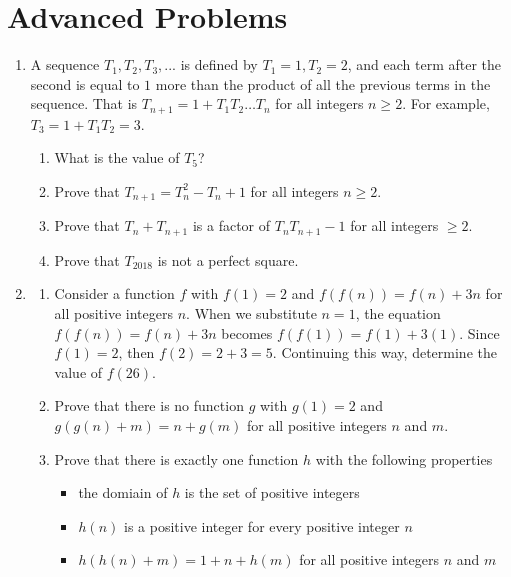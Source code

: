 \documentclass[12pt]{article}
\begin{document}
\section*{Advanced Problems}
\begin{enumerate}
    \item A sequence $T_1, T_2, T_3, ...$ is defined by $T_1 = 1, T_2 = 2$, and each term after the second is equal to $1$ more than the product of all the previous terms in the sequence. That is $T_{n + 1} = 1 + T_1T_2 \dots T_n$ for all integers $n \geq 2$. For example, $T_3 = 1 + T_1T_2 = 3$.
    \begin{enumerate}
        \item What is the value of $T_5$?
        \item Prove that $T_{n + 1} = T_n^2 - T_n + 1$ for all integers $n \geq 2$.
        \item Prove that $T_n + T_{n + 1}$ is a factor of $T_nT_{n + 1} - 1$ for all integers $\geq 2$.
        \item Prove that $T_{2018}$ is not a perfect square.
    \end{enumerate} \newpage

    \item 
    \begin{enumerate}
        \item Consider a function $f$ with $f(1) = 2$ and $f(f(n)) = f(n) + 3n$ for all positive integers $n$. When we substitute $n = 1$, the equation $f(f(n)) = f(n) + 3n$ becomes $f(f(1)) = f(1) + 3(1)$. Since $f(1) = 2$, then $f(2) = 2 + 3 = 5$. Continuing this way, determine the value of $f(26)$.
        \item Prove that there is no function $g$ with $g(1) = 2$ and $g(g(n) + m) = n + g(m)$ for all positive integers $n$ and $m$.
        \item Prove that there is exactly one function $h$ with the following properties
        \begin{itemize}
            \item the domiain of $h$ is the set of positive integers
            \item $h(n)$ is a positive integer for every positive integer $n$
            \item $h(h(n) + m) = 1 + n + h(m)$ for all positive integers $n$ and $m$
        \end{itemize}
    \end{enumerate}
\end{enumerate}
\end{document}
